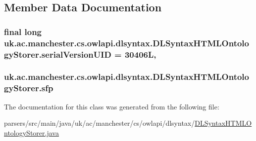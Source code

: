 \subsection{Member Data Documentation}
\hypertarget{classuk_1_1ac_1_1manchester_1_1cs_1_1owlapi_1_1dlsyntax_1_1_d_l_syntax_h_t_m_l_ontology_storer_a806581f7dff822745c9d3a47cd11ffe6}{
\subsubsection[{serial\-Version\-U\-I\-D}]{\setlength{\rightskip}{0pt plus 5cm}final long uk.\-ac.\-manchester.\-cs.\-owlapi.\-dlsyntax.\-D\-L\-Syntax\-H\-T\-M\-L\-Ontology\-Storer.\-serial\-Version\-U\-I\-D = 30406\-L\hspace{0.3cm}{\ttfamily [static]}, {\ttfamily [private]}}}\label{classuk_1_1ac_1_1manchester_1_1cs_1_1owlapi_1_1dlsyntax_1_1_d_l_syntax_h_t_m_l_ontology_storer_a806581f7dff822745c9d3a47cd11ffe6}
\hypertarget{classuk_1_1ac_1_1manchester_1_1cs_1_1owlapi_1_1dlsyntax_1_1_d_l_syntax_h_t_m_l_ontology_storer_a0eac84e7514b63befce37422ce635983}{
\subsubsection[{sfp}]{ uk.\-ac.\-manchester.\-cs.\-owlapi.\-dlsyntax.\-D\-L\-Syntax\-H\-T\-M\-L\-Ontology\-Storer.\-sfp\hspace{0.3cm}{\ttfamily [protected]}}}\label{classuk_1_1ac_1_1manchester_1_1cs_1_1owlapi_1_1dlsyntax_1_1_d_l_syntax_h_t_m_l_ontology_storer_a0eac84e7514b63befce37422ce635983}


The documentation for this class was generated from the following file\-:\begin{DoxyCompactItemize}
\item 
parsers/src/main/java/uk/ac/manchester/cs/owlapi/dlsyntax/\hyperlink{_d_l_syntax_h_t_m_l_ontology_storer_8java}{D\-L\-Syntax\-H\-T\-M\-L\-Ontology\-Storer.\-java}\end{DoxyCompactItemize}
